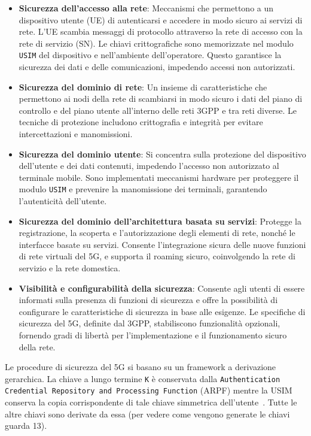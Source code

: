 \documentclass[english]{article}
\begin{document}
\begin{itemize}
	\item \textbf{Sicurezza dell'accesso alla rete}: Meccanismi che permettono a
	      un dispositivo utente (UE) di autenticarsi e accedere in modo sicuro ai
	      servizi di rete. L'UE scambia messaggi di protocollo attraverso la rete di accesso
	      con la rete di servizio (SN).
	      Le chiavi crittografiche sono memorizzate nel modulo \texttt{USIM} del dispositivo e nell'ambiente
	      dell'operatore. Questo garantisce la sicurezza dei dati e delle comunicazioni,
	      impedendo accessi non autorizzati.
	\item \textbf{Sicurezza del dominio di rete}: Un insieme di caratteristiche che permettono
	      ai nodi della rete di scambiarsi in modo sicuro i dati del piano di controllo e del piano
	      utente all'interno delle reti 3GPP e tra reti diverse. Le tecniche di protezione includono
	      crittografia e integrità per evitare intercettazioni e manomissioni.
	\item \textbf{Sicurezza del dominio utente}: Si concentra sulla protezione del dispositivo
	      dell'utente e dei dati contenuti, impedendo l'accesso non autorizzato al terminale mobile.
	      Sono implementati meccanismi hardware per proteggere il modulo   \texttt{USIM} e prevenire la
	      manomissione dei terminali, garantendo l'autenticità dell'utente.
	\item \textbf{Sicurezza del dominio dell'architettura basata su servizi}: Protegge la
	      registrazione, la scoperta e l'autorizzazione degli elementi di rete, nonché le interfacce
	      basate su servizi. Consente l'integrazione sicura delle nuove funzioni di rete virtuali
	      del 5G, e supporta il roaming sicuro, coinvolgendo la rete di servizio
	      e la rete domestica.
	\item \textbf{Visibilità e configurabilità della sicurezza}: Consente agli utenti di essere
	      informati sulla presenza di funzioni di sicurezza e offre la possibilità di configurare le
	      caratteristiche di sicurezza in base alle esigenze. Le specifiche di sicurezza del 5G,
	      definite dal 3GPP, stabiliscono funzionalità opzionali, fornendo gradi di libertà per
	      l'implementazione e il funzionamento sicuro della rete.
\end{itemize}

Le procedure di sicurezza del 5G si basano su un framework a derivazione
gerarchica. La chiave a lungo termine \texttt{K} è conservata dalla
\texttt{Authentication Credential Repository and Processing Function} (ARPF)
mentre la USIM conserva la copia corrispondente di tale chiave simmetrica
dell'utente~\cite{Jover2018Security}. Tutte le altre chiavi sono derivate da
essa (per vedere come vengono generate le chiavi guarda 13).
\end{document}
